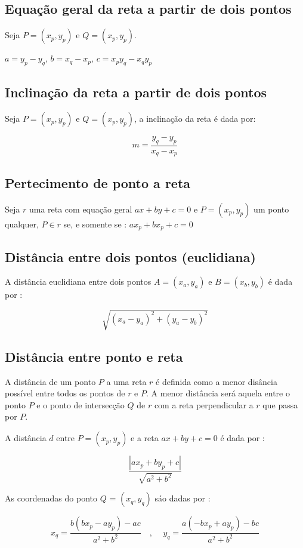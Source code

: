 \subsection{Equação geral da reta a partir de dois pontos}

Seja $P = (x_p, y_p)$ e $Q = (x_p, y_p)$.

$a = y_p - y_q$, $b = x_q-x_p$, $c = x_p y_q - x_q y_p$


\subsection{Inclinação da reta a partir de dois pontos}

Seja $P = (x_p, y_p)$ e $Q = (x_p, y_p)$, a inclinação da reta é dada por:

\begin{equation}
    m = \frac{y_q - y_p}{x_q - x_p}
\end{equation}

\subsection{Pertecimento de ponto a reta}

Seja $r$ uma reta com equação geral $ax + by + c = 0$ e $P = (x_p, y_p) $ um ponto qualquer, $P \in r$ se, e somente se : $a x_p + b x_p + c = 0$

\subsection{Distância entre dois pontos (euclidiana)}

A distância euclidiana entre dois pontos $A = (x_a, y_a)$ e $B = (x_b, y_b)$ é dada por :

$$ \sqrt{(x_a-y_a)^2 + (y_a-y_b)^2} $$

\subsection{Distância entre ponto e reta}

A distância de um ponto $P$ a uma reta $r$ é definida como a menor disância possível entre todos os pontos de $r$ e $P$. A menor distância será aquela entre o ponto $P$ e o ponto de intersecção $Q$ de $r$ com a reta perpendicular a $r$ que passa por $P$.

A distância $d$ entre $P = (x_p, y_p)$ e a reta $ax + by + c = 0$ é dada por :

\begin{equation}
    \frac{|a x_p + b y_p +c|}{\sqrt{a^2+b^2}}
\end{equation}

As coordenadas do ponto $Q$ = $(x_q, y_q)$ sáo dadas por : 

\begin{equation}
x_q = \frac{b (b x_p - a y_p)-ac}{a^2+b^2} \quad \text{, } \quad y_q = \frac{a(-bx_p+ay_p)-bc}{a^2+b^2}
\end{equation}

